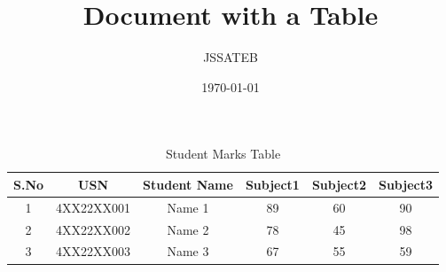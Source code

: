 \documentclass{article}
\title{Document with a Table}
\author{JSSATEB}
\date{\today}
\begin{document}
\maketitle

\begin{table}[h!]
    \centering
    \begin{tabular}{|c|c|c|c|c|c|}
        \hline
        S.No & USN & Student Name & Subject1 & Subject2 & Subject3 \\
        \hline
        1 & 4XX22XX001 & Name 1 & 89 & 60 & 90 \\
        2 & 4XX22XX002 & Name 2 & 78 & 45 & 98 \\
        3 & 4XX22XX003 & Name 3 & 67 & 55 & 59 \\
        \hline
    \end{tabular}
    \caption{Student Marks Table}
    \label{tab:marks}
\end{table}
\end{document}
